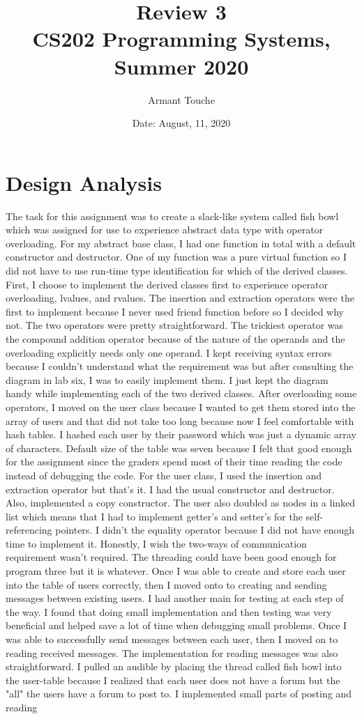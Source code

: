 \documentclass[11pt, a4paper]{article}
\title{\bf Review 3\\[1ex]
\rm\normalsize CS202 Programming Systems, Summer 2020 }
\date{\normalsize Date: August, 11, 2020}
\author{\normalsize Armant Touche}
\begin{document}
\vspace{0cm}\maketitle 

\section*{Design Analysis}
The task for this assignment was to create a slack-like system called fish bowl which was assigned for use to experience abstract data type with operator overloading. For my abstract base class, I had one function in total with a default constructor and destructor. One of my function was a pure virtual function so I did not have to use run-time type identification for which of the derived classes. First, I choose to implement the derived classes first to experience operator overloading, lvalues, and rvalues. The insertion and extraction operators were the first to implement because I never used friend function before so I decided why not. The two operators were pretty straightforward. The trickiest operator was the compound addition operator because of the nature of the operands and the overloading explicitly needs only one operand. I kept receiving syntax errors because I couldn't understand what the requirement was but after consulting the diagram in lab six, I was to easily implement them. I just kept the diagram handy while implementing each of the two derived classes. After overloading some operators, I moved on the user class because I wanted to get them stored into the array of users and that did not take too long because now I feel comfortable with hash tables. I hashed each user by their password which was just a dynamic array of characters. Default size of the table was seven because I felt that good enough for the assignment since the graders spend most of their time reading the code instead of debugging the code. For the user class, I used the insertion and extraction operator but that's it. I had the usual constructor and destructor. Also, implemented a copy constructor. The user also doubled as nodes in a linked list which means that I had to implement getter's and setter's for the self-referencing pointers. I didn't the equality operator because I did not have enough time to implement it. Honestly, I wish the two-ways of communication requirement wasn't required. The threading could have been good enough for program three but it is whatever. Once I was able to create and store each user into the table of users correctly, then I moved onto to creating and sending messages between existing users. I had another main for testing at each step of the way. I found that doing small implementation and then testing was very beneficial and helped save a lot of time when debugging small problems. Once I was able to successfully send messages between each user, then I moved on to reading received messages. The implementation for reading messages was also straightforward. I pulled an audible by placing the thread called fish bowl into the user-table because I realized that each user does not have a forum but the "all" the users have a forum to post to. I implemented small parts of posting and reading 
\end{document}
